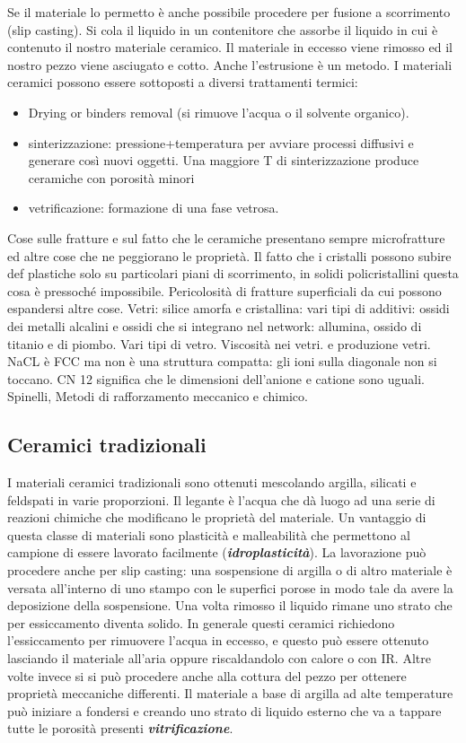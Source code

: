 Se il materiale lo permetto è anche possibile procedere per fusione a scorrimento (slip casting). Si cola il liquido in un contenitore che assorbe il liquido in cui è contenuto il nostro materiale ceramico. Il materiale in eccesso viene rimosso ed il nostro pezzo viene asciugato e cotto. Anche l'estrusione è un metodo.
I materiali ceramici possono essere sottoposti a diversi trattamenti termici:
\begin{itemize}
    \item Drying or binders removal (si rimuove l'acqua o il solvente organico).
    \item sinterizzazione: pressione+temperatura per avviare processi diffusivi e generare così nuovi oggetti. Una maggiore T di sinterizzazione produce ceramiche con porosità minori
    \item vetrificazione: formazione di una fase vetrosa.
\end{itemize}
Cose sulle fratture e sul fatto che le ceramiche presentano sempre microfratture ed altre cose che ne peggiorano le proprietà. Il fatto che i cristalli possono subire def plastiche solo su particolari piani di scorrimento, in solidi policristallini questa cosa è pressoché impossibile. Pericolosità di fratture superficiali da cui possono espandersi altre cose.
Vetri: silice amorfa e cristallina: vari tipi di additivi: ossidi dei metalli alcalini e ossidi che si integrano nel network: allumina, ossido di titanio e di piombo.
Vari tipi di vetro. Viscosità nei vetri. e produzione vetri. NaCL è FCC ma non è una struttura compatta: gli ioni sulla diagonale non si toccano. CN 12 significa che le dimensioni dell'anione e catione sono uguali. Spinelli, 
Metodi di rafforzamento meccanico e chimico.

\subsection{Ceramici tradizionali}

I materiali ceramici tradizionali sono ottenuti mescolando argilla, silicati e feldspati in varie proporzioni. Il legante è l'acqua che dà luogo ad una serie di reazioni chimiche che modificano le proprietà del materiale. Un vantaggio di questa classe di materiali sono plasticità e malleabilità che permettono al campione di essere lavorato facilmente (\textbf{\textit{idroplasticità}}). La lavorazione può procedere anche per slip casting: una sospensione di argilla o di altro materiale è versata all'interno di uno stampo con le superfici porose in modo tale da avere la deposizione della sospensione. Una volta rimosso il liquido rimane uno strato che per essiccamento diventa solido. In generale questi ceramici richiedono l'essiccamento per rimuovere l'acqua in eccesso, e questo può essere ottenuto lasciando il materiale all'aria oppure riscaldandolo con calore o con IR. Altre volte invece si si può procedere anche alla cottura del pezzo per ottenere proprietà meccaniche differenti. Il materiale a base di argilla ad alte temperature può iniziare a fondersi e creando uno strato di liquido esterno che va a tappare tutte le porosità presenti \textbf{\textit{vitrificazione}}.

